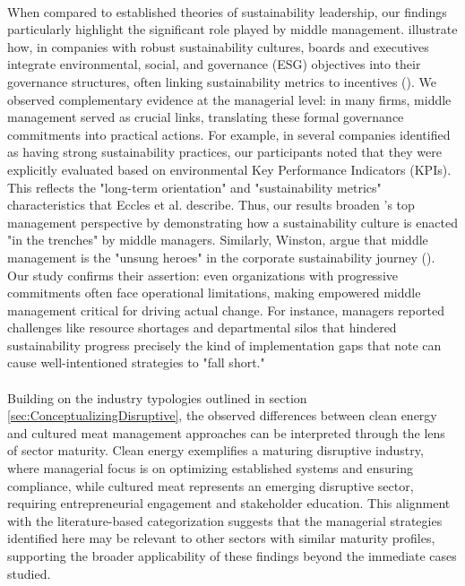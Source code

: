 	\paragraph*{} When compared to established theories of sustainability leadership, our findings particularly highlight the significant role played by middle management. \citeauthor{Eccles2014} illustrate how, in companies with robust sustainability cultures, boards and executives integrate environmental, social, and governance (ESG) objectives into their governance structures, often linking sustainability metrics to incentives (\textcite{Eccles2014}). We observed complementary evidence at the managerial level: in many firms, middle management served as crucial links, translating these formal governance commitments into practical actions. For example, in several companies identified as having strong sustainability practices, our participants noted that they were explicitly evaluated based on environmental Key Performance Indicators (KPIs). This reflects the "long-term orientation" and "sustainability metrics" characteristics that Eccles et al. describe. Thus, our results broaden \citeauthor{Eccles2014}'s top management perspective by demonstrating how a sustainability culture is enacted "in the trenches" by middle managers. Similarly, Winston, \citeauthor{Winston2023} argue that middle management is the "unsung heroes" in the corporate sustainability journey (\textcite{Winston2023}). Our study confirms their assertion: even organizations with progressive commitments often face operational limitations, making empowered middle management critical for driving actual change. For instance, managers reported challenges like resource shortages and departmental silos that hindered sustainability progress precisely the kind of implementation gaps that \citeauthor{Winston2023} note can cause well-intentioned strategies to "fall short."
	
	\paragraph*{} Building on the industry typologies outlined in section \ref{sec:ConceptualizingDisruptive}, the observed differences between clean energy and cultured meat management approaches can be interpreted through the lens of sector maturity. Clean energy exemplifies a maturing disruptive industry, where managerial focus is on optimizing established systems and ensuring compliance, while cultured meat represents an emerging disruptive sector, requiring entrepreneurial engagement and stakeholder education. This alignment with the literature-based categorization suggests that the managerial strategies identified here may be relevant to other sectors with similar maturity profiles, supporting the broader applicability of these findings beyond the immediate cases studied. 
	
